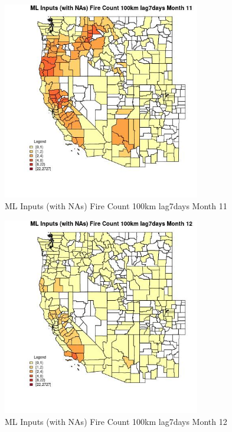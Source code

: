 \clearpage 

\begin{figure} 
\centering  
\includegraphics[width=0.77\textwidth]{Code_Outputs/Report_ML_input_PM25_Step4_part_f_de_duplicated_aveswNAs_CountyFire_Count_100km_lag7daysmedianMonth11.jpg} 
\caption{\label{fig:Report_ML_input_PM25_Step4_part_f_de_duplicated_aveswNAsCountyFire_Count_100km_lag7daysmedianMonth11}ML Inputs (with NAs) Fire Count 100km lag7days Month 11} 
\end{figure} 
 

\begin{figure} 
\centering  
\includegraphics[width=0.77\textwidth]{Code_Outputs/Report_ML_input_PM25_Step4_part_f_de_duplicated_aveswNAs_CountyFire_Count_100km_lag7daysmedianMonth12.jpg} 
\caption{\label{fig:Report_ML_input_PM25_Step4_part_f_de_duplicated_aveswNAsCountyFire_Count_100km_lag7daysmedianMonth12}ML Inputs (with NAs) Fire Count 100km lag7days Month 12} 
\end{figure} 
 


